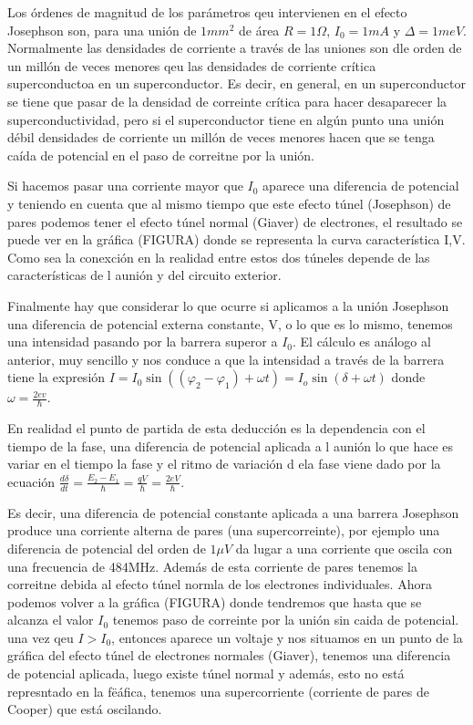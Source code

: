 Los órdenes de magnitud de los parámetros qeu intervienen en el efecto Josephson son, para una unión de $1mm^2$ de área $R = 1 \Omega$, $I_0 = 1 mA$ y $\Delta = 1meV$. Normalmente las densidades de corriente a través de las uniones son dle orden de un millón de veces menores qeu las densidades de corriente crítica superconductoa en un superconductor. Es decir, en general, en un superconductor se tiene que pasar de la densidad de correinte crítica para hacer desaparecer la superconductividad, pero si el superconductor tiene en algún punto una unión débil densidades de corriente un millón de veces menores hacen que se tenga caída de potencial en el paso de correitne por la unión.

Si hacemos pasar una corriente mayor que $I_0$ aparece una diferencia de potencial y teniendo en cuenta que al mismo tiempo que este efecto túnel (Josephson) de pares podemos tener el efecto túnel normal (Giaver) de electrones, el resultado se puede ver en la gráfica (FIGURA) donde se representa la curva característica I,V. Como sea la conexción en la realidad entre estos dos túneles depende de las características de l aunión y del circuito exterior.

Finalmente hay que considerar lo que ocurre si aplicamos a la unión Josephson una diferencia de potencial externa constante, V, o lo que es lo mismo, tenemos una intensidad pasando por la barrera superor a $I_0$. El cálculo es análogo al anterior, muy sencillo y nos conduce a que la intensidad a través de la barrera tiene la expresión $I = I_0 \sin( (\varphi_2 - \varphi_1) + \omega t) = I_o \sin(\delta + \omega t)$ donde $\omega = \frac{2 ev}{\hbar}$.

En realidad el punto de partida de esta deducción es la dependencia con el tiempo de la fase, una diferencia de potencial aplicada a l aunión lo que hace es variar en el tiempo la fase y el ritmo de variación d ela fase viene dado por la ecuación $\frac{d \delta}{d t} = \frac{E_2 - E_1}{\hbar} = \frac{qV}{\hbar} = \frac{2 eV}{\hbar}$.

Es decir, una diferencia de potencial constante aplicada a una barrera Josephson produce una corriente alterna de pares (una supercorreinte), por ejemplo una diferencia de potencial del orden de $1 \mu V$ da lugar a una corriente que oscila con una frecuencia de 484MHz. Además de esta corriente de pares tenemos la correitne debida al efecto túnel normla de los electrones individuales. Ahora podemos volver a la gráfica (FIGURA) donde tendremos que hasta que se alcanza el valor $I_0$ tenemos paso de correinte por la unión sin caida de potencial. una vez qeu $I > I_0$, entonces aparece un voltaje y nos situamos en un punto de la gráfica del efecto túnel de electrones normales (Giaver), tenemos una diferencia de potencial aplicada, luego existe túnel normal y además, esto no está represntado en la fëáfica, tenemos una supercorriente (corriente de pares de Cooper) que está oscilando.

